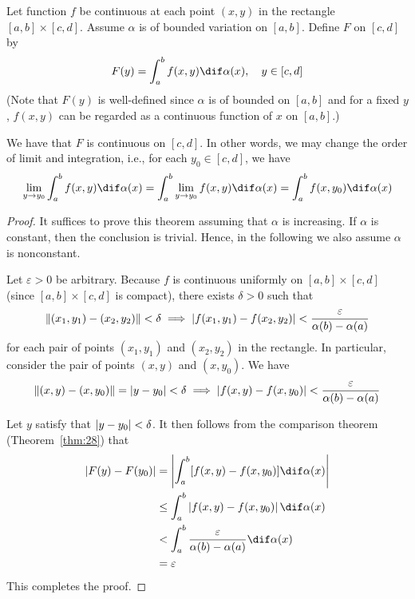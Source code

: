\documentclass[thmcnt=section, color=blue, 12pt]{my-elegantbook}
\begin{document}
\begin{theorem} \label{thm:29}
	Let function $f$ be continuous at each point $(x, y)$
	in the rectangle $[a, b] \times [c, d]$.
	Assume $\alpha$ is of bounded variation on $[a, b]$.
	Define $F$ on $[c, d]$ by
	\begin{align*}
		F(y) = \int_a^b f(x, y) \dif \alpha(x), \quad y \in [c, d]
	\end{align*}
	(Note that $F(y)$ is well-defined since  $\alpha$ is of bounded on $[a, b]$
	and for a fixed $y$, $f(x, y)$
	can be regarded as a continuous function of $x$ on $[a, b]$.)

	We have that $F$ is continuous on $[c, d]$.
	In other words, we may change the order of limit and integration, i.e.,
	for each $y_0 \in [c, d]$, we have
	\begin{align*}
		\lim_{y \to y_0} \int_a^b f(x, y) \dif \alpha(x)
		= \int_a^b \lim_{y \to y_0} f(x, y) \dif \alpha(x)
		= \int_a^b f(x, y_0) \dif \alpha(x)
	\end{align*}
\end{theorem}

\begin{proof}
	It suffices to prove this theorem assuming that $\alpha$ is increasing.
	If $\alpha$ is constant, then the conclusion is trivial.
	Hence, in the following we also assume $\alpha$ is nonconstant.

	Let $\varepsilon > 0$ be arbitrary.
	Because $f$ is continuous uniformly on $[a, b] \times [c, d]$
	(since $[a, b] \times [c, d]$ is compact),
	there exists $\delta > 0$ such that
	\begin{align*}
		\left\lVert (x_1, y_1) - (x_2, y_2) \right\rVert < \delta
		\implies \left\lvert f(x_1, y_1) - f(x_2, y_2) \right\rvert
		< \frac{\varepsilon}{\alpha(b) - \alpha(a)}
	\end{align*}
	for each pair of points $(x_1, y_1)$ and $(x_2, y_2)$ in the rectangle.
	In particular, consider the pair of points $(x, y)$ and $(x, y_0)$.
	We have
	\begin{align*}
		\left\lVert (x, y) - (x, y_0) \right\rVert = \left\lvert y - y_0 \right\rvert < \delta
		\implies \left\lvert f(x, y) - f(x, y_0) \right\rvert
		< \frac{\varepsilon}{\alpha(b) - \alpha(a)}
	\end{align*}

	Let $y$ satisfy that $\left\lvert y - y_0 \right\rvert < \delta$.
	It then follows from the comparison theorem (Theorem~\ref{thm:28}) that
	\begin{align*}
		\abs{F(y) - F(y_0)}
		 & = \abs{\int_a^b [f(x, y) - f(x, y_0)] \dif \alpha(x)}               \\
		 & \leq \int_a^b \abs{f(x, y) - f(x, y_0)} \dif \alpha(x)              \\
		 & < \int_a^b \frac{\varepsilon}{\alpha(b) - \alpha(a)} \dif \alpha(x) \\
		 & = \varepsilon
	\end{align*}
	This completes the proof.
\end{proof}
\end{document}

